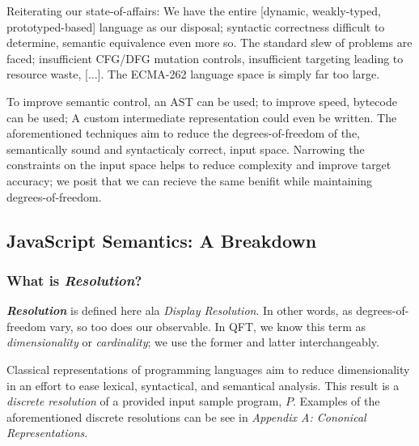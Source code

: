 
Reiterating our state-of-affairs: We have the entire [dynamic, weakly-typed, prototyped-based] language as our disposal; 
syntactic correctness difficult to determine, semantic equivalence\footnotemark
{}
even more so. The standard slew of problems are faced; insufficient CFG/DFG mutation controls, insufficient 
targeting leading to resource waste, [...]. The \textsc{ECMA-262} language space is simply far too large. 

To improve semantic control, an AST can be used; to improve speed, bytecode can be used; A custom intermediate
representation could even be written. The aforementioned techniques aim to reduce the degrees-of-freedom of the, semantically sound and
syntacticaly correct, input space. Narrowing the constraints on the input space helps to reduce complexity and improve target accuracy; 
we posit that we can recieve the same benifit while maintaining degrees-of-freedom.

\subsection{JavaScript Semantics: A Breakdown}

\subsubsection{What is \textit{Resolution}?}

\textbf{\textit{Resolution}} is defined here ala \textit{Display Resolution}. In other words, as degrees-of-freedom vary, so too 
does our observable. In QFT, we know this term as \textit{dimensionality} or \textit{cardinality}; we use the former
and latter interchangeably.

Classical representations of programming languages aim to reduce dimensionality in an effort to ease lexical, syntactical, and 
semantical analysis. This result is a \textit{discrete resolution} of a provided input sample program, $P$. Examples of the 
aforementioned discrete resolutions can be see in \textit{Appendix A: Cononical Representations}.


